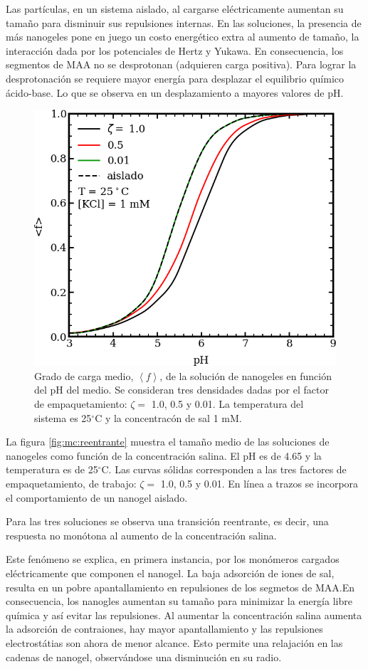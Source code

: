 	Las part\'iculas, en un sistema aislado, al cargarse el\'ectricamente aumentan su tama\~no para disminuir sus repulsiones internas. En las soluciones, la presencia de m\'as nanogeles pone en juego un costo energ\'etico extra al aumento de tama\~no, la interacci\'on dada por los potenciales de Hertz y Yukawa. En consecuencia, los segmentos de MAA no se desprotonan (adquieren carga positiva). Para lograr la desprotonaci\'on se requiere mayor energ\'ia para desplazar el equilibrio qu\'imico \'acido-base. Lo que se observa en un desplazamiento a mayores valores de pH.
	
	\begin{figure}
		\centering
		\includegraphics[width=0.45\linewidth]{Figures/graph-mc/fvspH.png}
		\caption{Grado de carga medio, $\left<f\right>$, de la soluci\'on de nanogeles en funci\'on del pH del medio. Se consideran tres densidades dadas por el factor de empaquetamiento: $\zeta =$ 1.0, 0.5 y 0.01. La temperatura del sistema es 25$^\circ$C y la concentrac\'on de sal 1 mM.}
		\label{fig:mc:fvspH}
	\end{figure}
	
	
	La figura \ref{fig:mc:reentrante} muestra el tama\~no medio de las soluciones de nanogeles como funci\'on de la concentraci\'on salina. El pH es de 4.65 y la temperatura es de 25$^\circ$C. Las curvas s\'olidas corresponden a las tres factores de empaquetamiento, de trabajo: $\zeta =$ 1.0, 0.5 y 0.01. En l\'inea a trazos se incorpora el comportamiento de un nanogel aislado.
	
	Para las tres soluciones se observa una transici\'on reentrante, es decir, una respuesta no mon\'otona al aumento de la concentraci\'on salina.
	
	Este fen\'omeno se explica, en primera instancia, por los mon\'omeros cargados el\'ectricamente que componen el nanogel. La baja adsorci\'on de iones de sal, resulta en un pobre apantallamiento en repulsiones de los segmetos de MAA.En consecuencia, los nanogles aumentan su tama\~no para minimizar la energ\'ia libre qu\'imica y as\'i evitar las repulsiones. Al aumentar la concentraci\'on salina aumenta la adsorci\'on de contraiones, hay mayor apantallamiento y las repulsiones electrost\'atias son ahora de menor alcance. Esto permite una relajaci\'on en las cadenas de nanogel, observ\'andose una disminuci\'on en su radio.
	
